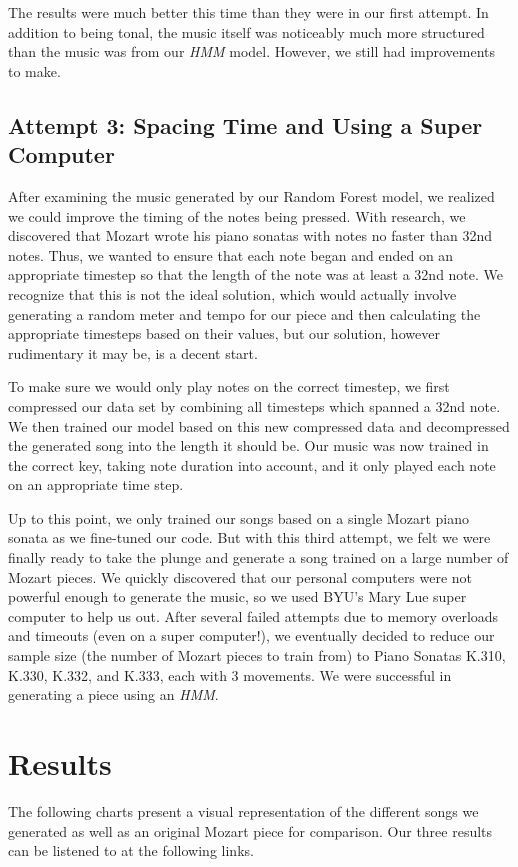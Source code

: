 \documentclass[11pt]{article}
\begin{document}
The results were much better this time than they were in our first attempt. In addition to being tonal, the music itself was noticeably much more structured than the music was from our \textit{HMM} model. However, we still had improvements to make.

\subsection{Attempt 3: Spacing Time and Using a Super Computer}
After examining the music generated by our Random Forest model, we realized we could improve the timing of the notes being pressed. With research, we discovered that Mozart wrote his piano sonatas with notes no faster than 32nd notes. Thus, we wanted to ensure that each note began and ended on an appropriate timestep so that the length of the note was at least a 32nd note. We recognize that this is not the ideal solution, which would actually involve generating a random meter and tempo for our piece and then calculating the appropriate timesteps based on their values, but our solution, however rudimentary it may be, is a decent start.

To make sure we would only play notes on the correct timestep, we first compressed our data set by combining all timesteps which spanned a 32nd note. We then trained our model based on this new compressed data and decompressed the generated song into the length it should be. Our music was now trained in the correct key, taking note duration into account, and it only played each note on an appropriate time step.

Up to this point, we only trained our songs based on a single Mozart piano sonata as we fine-tuned our code. But with this third attempt, we felt we were finally ready to take the plunge and generate a song trained on a large number of Mozart pieces. We quickly discovered that our personal computers were not powerful enough to generate the music, so we used BYU's Mary Lue super computer to help us out. After several failed attempts due to memory overloads and timeouts (even on a super computer!), we eventually decided to reduce our sample size (the number of Mozart pieces to train from) to Piano Sonatas K.310, K.330, K.332, and K.333, each with 3 movements. We were successful in generating a piece using an \textit{HMM}.

\section{Results}
The following charts present a visual representation of the different songs we generated as well as an original Mozart piece for comparison. Our three results can be listened to at the following links.
\end{document}
